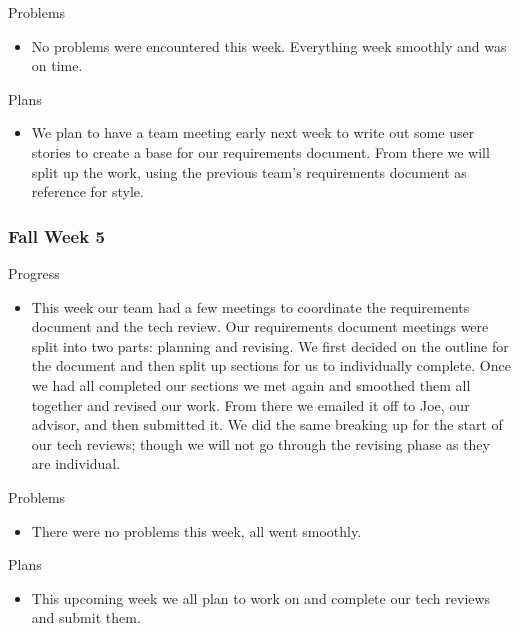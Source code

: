        \noindent
        Problems
        \begin{itemize}
            \item No problems were encountered this week.  Everything week smoothly and was on time.
        \end{itemize}
        
        \noindent
        Plans
        \begin{itemize}
            \item We plan to have a team meeting early next week to write out some user stories to create a base for our requirements document.  From there we will  split up the work, using the previous team’s requirements document as reference for style.
        \end{itemize}
    
    \subsubsection{Fall Week 5}
    
        \noindent
        Progress
        \begin{itemize}
            \item This week our team had a few meetings to coordinate the requirements document and the tech review.  Our requirements document meetings were split into two parts: planning and revising.  We first decided on the outline for the document and then split up sections for us to individually complete.  Once we had all completed our sections we met again and smoothed them all together and revised our work.  From there we emailed it off to Joe, our advisor, and then submitted it.  We did the same breaking up for the start of our tech reviews; though we will not go through the revising phase as they are individual.
        \end{itemize}
        
        \noindent
        Problems
        \begin{itemize}
            \item There were no problems this week, all went smoothly.
        \end{itemize}
        
        \noindent
        Plans
        \begin{itemize}
            \item This upcoming week we all plan to work on and complete our tech reviews and submit them.
        \end{itemize}
        
